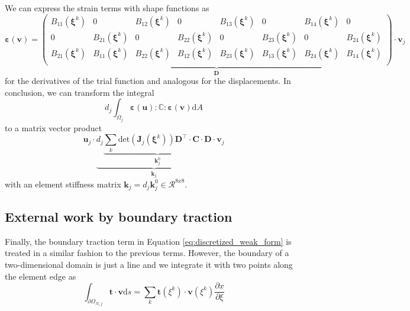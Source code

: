 We can express the strain terms with shape functions as 
\setlength\arraycolsep{2pt}
\begin{equation}
    \pmb{\varepsilon}\left(\mathbf{v}\right)
    =
    \underbrace{
    \begin{pmatrix}
            B_{11}(\pmb{\xi}^k) & 0 & B_{12}(\pmb{\xi}^k) & 0 & B_{13}(\pmb{\xi}^k) & 0 & B_{14}(\pmb{\xi}^k) & 0\\
            0 & B_{21}(\pmb{\xi}^k) & 0 & B_{22}(\pmb{\xi}^k) & 0 & B_{23}(\pmb{\xi}^k) & 0 & B_{24}(\pmb{\xi}^k)\\
            B_{21}(\pmb{\xi}^k) & B_{11}(\pmb{\xi}^k) & B_{22}(\pmb{\xi}^k) & B_{12}(\pmb{\xi}^k) & B_{23}(\pmb{\xi}^k) & B_{13}(\pmb{\xi}^k) & B_{24}(\pmb{\xi}^k) & B_{14}(\pmb{\xi}^k)\\
    \end{pmatrix} 
    }_{\mathbf{D}}
    \cdot 
    \mathbf{v}_j
\end{equation}
\setlength\arraycolsep{5pt}
for the derivatives of the trial function and analogous for the displacements. In conclusion, we can transform the integral 
\begin{equation}
    d_j \int_{\Omega_j} \pmb{\varepsilon}(\mathbf{u}) : \mathbb{C} :  \pmb{\varepsilon}(\mathbf{v}) \text{d}A 
\end{equation}
to a matrix vector product 
\begin{equation}
    \mathbf{u}_j \cdot 
    \underbrace{
    d_j 
    \underbrace{ 
    \sum_k \text{det}\left(\mathbf{J}_j(\pmb{\xi}^k)\right)\mathbf{D}^\top \cdot \mathbf{C} \cdot \mathbf{D}}_{\mathbf{k}^0_j}
    }_{\mathbf{k}_j}
    \cdot \mathbf{v}_j
\end{equation}
with an element stiffness matrix $\mathbf{k}_j = d_j  \mathbf{k}^0_j \in \mathcal{R}^{8x8}$. 

\subsection{External work by boundary traction}
Finally, the boundary traction term in Equation \eqref{eq:discretized_weak_form} is treated in a similar fashion to the previous terms. However, the boundary of a two-dimensional domain is just a line and we integrate it with two points along the element edge as 
\begin{equation}
    \int_{\partial \Omega_{N,j}} \mathbf{t} \cdot \mathbf{v} \text{d}s
    =
    \sum_k \mathbf{t}(\xi^k) \cdot \mathbf{v}(\xi^k) \frac{\partial x}{\partial \xi} 
\end{equation}

